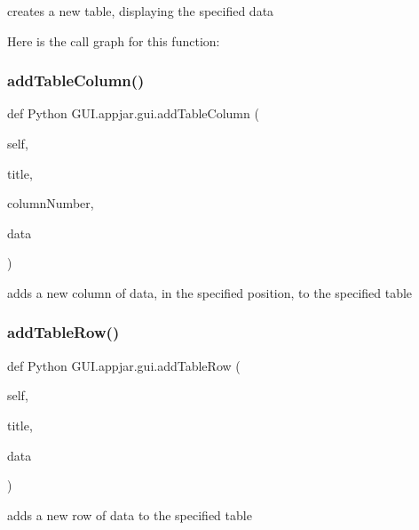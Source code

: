 \begin{DoxyVerb}creates a new table, displaying the specified data \end{DoxyVerb}
 Here is the call graph for this function\+:
\mbox{\label{class_python_01_g_u_i_1_1appjar_1_1gui_ab23cc6b9650da8d4398dddaaa3bcec03}} 
\subsubsection{\texorpdfstring{add\+Table\+Column()}{addTableColumn()}}
{\footnotesize\ttfamily def Python G\+U\+I.\+appjar.\+gui.\+add\+Table\+Column (\begin{DoxyParamCaption}\item[{}]{self,  }\item[{}]{title,  }\item[{}]{column\+Number,  }\item[{}]{data }\end{DoxyParamCaption})}

\begin{DoxyVerb}adds a new column of data, in the specified position, to the specified table \end{DoxyVerb}
 \mbox{\label{class_python_01_g_u_i_1_1appjar_1_1gui_aa4837b55b3c3eade8bad73f7a887380b}} 
\subsubsection{\texorpdfstring{add\+Table\+Row()}{addTableRow()}}
{\footnotesize\ttfamily def Python G\+U\+I.\+appjar.\+gui.\+add\+Table\+Row (\begin{DoxyParamCaption}\item[{}]{self,  }\item[{}]{title,  }\item[{}]{data }\end{DoxyParamCaption})}

\begin{DoxyVerb}adds a new row of data to the specified table \end{DoxyVerb}
 \mbox{\label{class_python_01_g_u_i_1_1appjar_1_1gui_afad6a7618603a37b5bf519123bf013b7}} 
